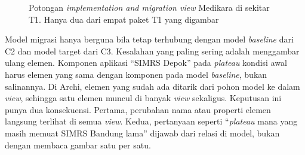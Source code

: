 \begin{figure}[!htb]
  \centering
  
  \caption{Potongan \textit{implementation and migration view} Medikara di
           sekitar T1. Hanya dua dari empat paket T1 yang digambar}
  \label{fig:ch12-migration-view}
\end{figure}

Model migrasi hanya berguna bila tetap terhubung dengan model
\textit{baseline} dari C2 dan model target dari C3. Kesalahan yang paling
sering adalah menggambar ulang elemen. Komponen aplikasi ``SIMRS Depok'' pada
\textit{plateau} kondisi awal harus elemen yang sama dengan komponen pada model
\textit{baseline}, bukan salinannya. Di Archi, elemen yang sudah ada ditarik
dari pohon model ke dalam \textit{view}, sehingga satu elemen muncul di banyak
\textit{view} sekaligus. Keputusan ini punya dua konsekuensi. Pertama,
perubahan nama atau properti elemen langsung terlihat di semua \textit{view}.
Kedua, pertanyaan seperti ``\textit{plateau} mana yang masih memuat SIMRS
Bandung lama'' dijawab dari relasi di model, bukan dengan membaca gambar satu
per satu.

